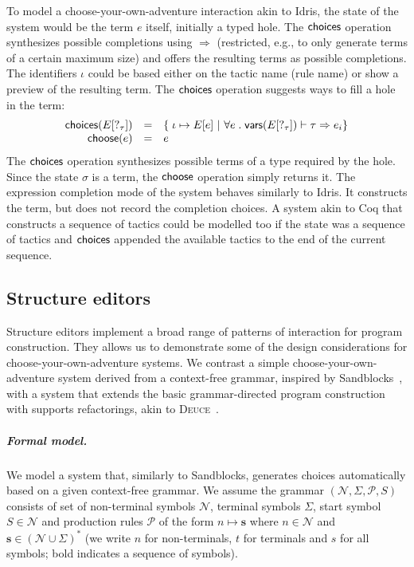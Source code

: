 \documentclass[ a4paper,UKenglish,cleveref, autoref, thm-restate]{lipics-v2021}
\newcommand{\ident}[1]{\textsf{#1}}
\newcommand{\select}{\textnormal{\ident{choose}}}
\newcommand{\choices}{\textnormal{\ident{choices}}}
\begin{document}
To model a choose-your-own-adventure interaction akin to Idris, the state of the system
would be the term $e$ itself, initially a typed hole. The $\choices$ operation synthesizes
possible completions using $\Rightarrow$ (restricted, e.g., to only generate terms of a certain
maximum size) and offers the resulting terms as possible completions. The identifiers $\iota$
could be based either on the tactic name (rule name) or show a preview of the resulting term.
The $\choices$ operation suggests ways to fill a hole in the term:
\[
\begin{array}{rcl}
\choices(E[?_\tau]) &=& \{\; \iota \mapsto E[e] ~|~ \forall e\;.\; \ident{vars}(E[?_\tau]) \vdash \tau \Rightarrow e_i \}\\
\select(e) &=& e
\end{array}
\]
The $\choices$ operation synthesizes possible terms of a type required by the hole. Since the
state $\sigma$ is a term, the $\select$ operation simply returns it. The expression completion
mode of the system behaves similarly to Idris. It constructs the term, but does not record the
completion choices. A system akin to Coq that constructs a sequence of tactics could be modelled
too if the state was a sequence of tactics and $\choices$ appended the available tactics
to the end of the current sequence.


\subsection{Structure editors}
\label{sec:examples-struct}

Structure editors implement a broad range of patterns of interaction for program construction.
They allows us to demonstrate some of the design considerations for
choose-your-own-adventure systems. We contrast a simple choose-your-own-adventure system
derived from a context-free grammar, inspired by Sandblocks~\cite{beckmann-2023-all},
with a system that extends the basic grammar-directed program construction with supports
refactorings, akin to \textsc{Deuce}~\cite{hempel-2018-deuce}.

\subparagraph{Formal model.}
We model a system that, similarly to Sandblocks, generates choices automatically based on a given
context-free grammar. We assume the grammar $(\mathcal{N},\Sigma,\mathcal{P},S)$ consists of set of
non-terminal symbols $\mathcal{N}$, terminal symbols $\Sigma$, start symbol $S\in\mathcal{N}$
and production rules $\mathcal{P}$ of the form $n\mapsto\boldsymbol{s}$ where
$n\in\mathcal{N}$ and $\boldsymbol{s}\in(\mathcal{N}\cup\Sigma)^{*}$ (we write $n$ for non-terminals,
$t$ for terminals and $s$ for all symbols; bold indicates a sequence of symbols).
\end{document}
